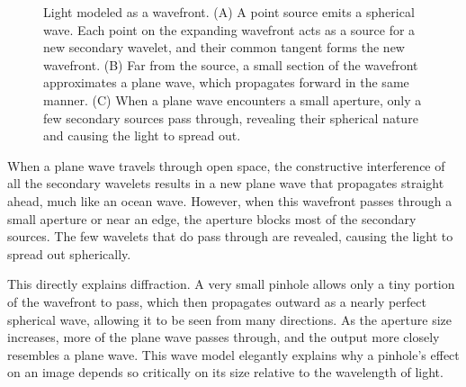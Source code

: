 \documentclass[
  letterpaper,
]{book}
\begin{document}
\begin{figure}


\caption{\label{fig-huygens-waves}Light modeled as a wavefront. (A) A
point source emits a spherical wave. Each point on the expanding
wavefront acts as a source for a new secondary wavelet, and their common
tangent forms the new wavefront. (B) Far from the source, a small
section of the wavefront approximates a plane wave, which propagates
forward in the same manner. (C) When a plane wave encounters a small
aperture, only a few secondary sources pass through, revealing their
spherical nature and causing the light to spread out.}

\end{figure}%

When a plane wave travels through open space, the constructive
interference of all the secondary wavelets results in a new plane wave
that propagates straight ahead, much like an ocean wave. However, when
this wavefront passes through a small aperture or near an edge, the
aperture blocks most of the secondary sources. The few wavelets that do
pass through are revealed, causing the light to spread out spherically.

This directly explains diffraction. A very small pinhole allows only a
tiny portion of the wavefront to pass, which then propagates outward as
a nearly perfect spherical wave, allowing it to be seen from many
directions. As the aperture size increases, more of the plane wave
passes through, and the output more closely resembles a plane wave. This
wave model elegantly explains why a pinhole's effect on an image depends
so critically on its size relative to the wavelength of light.
\end{document}
